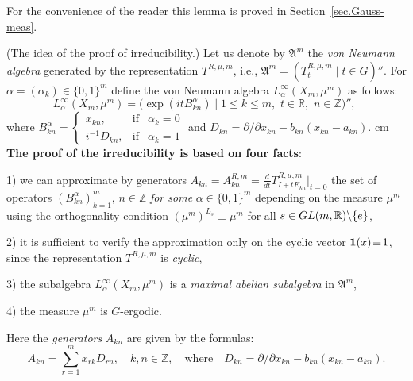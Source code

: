 \documentclass[preprint,12pt]{elsarticle}
\numberwithin{equation}{section}
\begin{document}
%
For the convenience of the reader this lemma is proved in Section~\ref{sec.Gauss-meas}.
%
\begin{rem}
\label{r.irr-idea-G} (The idea of the proof of
irreducibility.) Let us denote by ${\mathfrak A}^m$ the  {\it von
Neumann algebra} generated by the representation $T^{R,\mu,m}$, i.e., $
{\mathfrak A^m}=(T^{R,\mu,m}_t\mid t\in G)''. $ For
$\alpha\!=\!(\alpha_k)\!\in\!\{0,1\}^m$ define the von Neumann algebra
$L^\infty_\alpha(X_m,\mu^m)$ as follows:
$$
L^\infty_\alpha(X_m,\mu^m)\!=\!\Big(\exp(itB^\alpha_{kn})\mid
1\leq k\leq m,\,\,t\in {\mathbb R},\,\,n\in {\mathbb
Z}\Big)'',\,\,
$$
where $
B^\alpha_{kn}\!=\!\left\{\begin{array}{rcc}
 x_{kn},&\text{if}&\alpha_k=0\\
 i^{-1}D_{kn},&\text{if}&\alpha_k=1
\end{array}\right.$ and $D_{kn}=\partial/\partial x_{kn}-b_{kn}(x_{kn}-a_{kn})$.
 cm
{\bf The proof of the  irreducibility is based on  four
facts}:
\par 1) we can approximate by generators
$A_{kn}=A_{kn}^{R,m}=\frac{d}{dt}T^{R,\mu,m}_{I+tE_{kn}}\vert_{t=0}$
the set of operators $(B^\alpha_{kn})_{k=1}^m,\,n\!\in\!{\mathbb
Z}$ {\it for some} $\alpha\!\in\!\{0,1\}^m$ depending on the measure
$\mu^m$  using the orthogonality condition
$(\mu^m)^{L_{s}}\perp \mu^m$ for all $s\in {\rm GL}(m,{\mathbb
R})\backslash{\{e\}}$,
\par 2)
%
it is sufficient to  verify the approximation  only on the  cyclic vector
${\bf 1}(x)\!\equiv\! 1$, since the representation $T^{R,\mu,m}$ is {\it cyclic}, 
%
\par 3) the subalgebra $L^\infty_\alpha(X_m,\mu^m)$
is a {\it maximal abelian subalgebra} in ${\mathfrak A}^m$,
\par 4)  the measure $\mu^m$ is $G$-ergodic. 

Here the 
{\it generators}
$A_{kn}$ are given by the formulas:
$$
A_{kn}\!=\!\sum_{r=1}^{m}x_{rk}D_{rn},\quad k,n \in
{\mathbb Z},\quad\text{where}\quad D_{kn}=\partial/\partial x_{kn}-b_{kn}(x_{kn}-a_{kn}).
$$
\end{rem}
%
\end{document}
